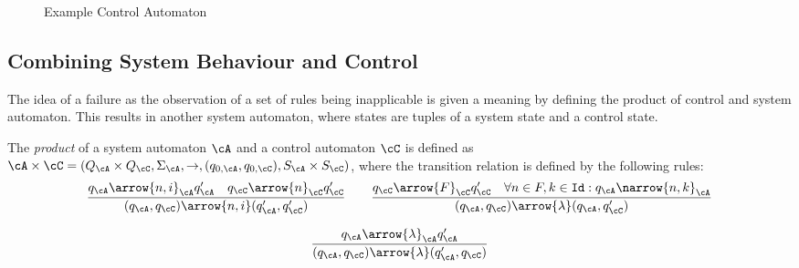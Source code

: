 \begin{figure}[tb]
\centering
{}
\caption{Example Control Automaton}
\label{fig:ca_example}
\end{figure}
%
\subsection{Combining System Behaviour and Control}

The idea of a failure as the observation of a set of rules being inapplicable
is given a meaning by defining the product of control and system automaton.
This results in another system automaton, where states are tuples of a system
state and a control state.

\begin{definition}[product]\label{def:prod}
The \emph{product} of a system automaton $\cA$ and a control automaton $\cC$ is
defined as $\cA\times \cC = ( Q_\cA \times Q_\cC, \Sigma_\cA, \rightarrow,
(q_{0,\cA},q_{0,\cC}),  S_\cA \times S_\cC)$, where the transition relation is defined by the following rules:
%
\begin{equation*}
\frac
{q_\cA \arrow{n,i}_\cA q_\cA' \quad q_\cC \arrow{n}_\cC q_\cC'}{
(q_\cA,q_\cC) \arrow{n,i} (q_\cA',q_\cC')}
\qquad
\frac
{q_\cC \arrow{F}_\cC q_\cC' \quad \forall n \in F, k \in {\tt Id}: q_\cA \narrow{n,k}_\cA}
{(q_\cA,q_\cC) \arrow{\lambda} (q_\cA,q_\cC')}
\end{equation*}

\begin{equation*}
\frac
{q_\cA \arrow{\lambda}_\cA q_\cA'}
{(q_\cA,q_\cC) \arrow{\lambda} (q_\cA',q_\cC)}
\end{equation*}
\end{definition}

